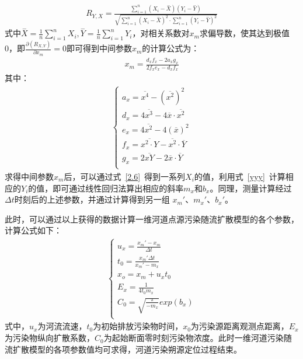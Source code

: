 \documentclass{whutmod}
\begin{document}
	\begin{gather*}
		R_{Y,X}=\frac{\sum_{i=1}^{n}(X_{i}-\overset{-}{X})(Y_{i}-\overset{-}{Y})}{\sqrt{\sum_{i=1}^{n}(X_{i}-\overset{-}{X})^{2}\cdot \sum_{i=1}^{n}(Y_{i}-\overset{-}{Y})^{2}}}
	\end{gather*}
	式中$\overset{-}{X}=\frac{1}{n}\sum_{i=1}^{n}X_{i},
	\overset{-}{Y}=\frac{1}{n}\sum_{i=1}^{n}Y_{i}
	$，对相关系数对$x_{m}$求偏导数，使其达到极值0，即$\frac{\partial(R_{X,Y}) }{\partial x_{m}}=0$即可得到中间参数$x_{m}$的计算公式为：
		\begin{gather}
x_{m}=\frac{d_{x}f_{x}-2a_{x}g_{x}}{2f_{x}e_{x}-d_{x}f_{x}}\label{2.6}
	\end{gather}
	其中：
		\begin{gather*}
	\left\{\begin{matrix}
a_{x}=\overline {x^{4}}-(\overline {x^{2}})^{2}	\\
	d_{x}=4\overline {x^{3}}-4\overline {x}\cdot\overline {x^{2}}\\
	e_{x}=4\overline{x^{2}}-4(\overline{x})^{2} \\
	f_{x}=\overline{x^{2}\cdot Y}-\overline{x^{2}}\cdot \overline{Y}\\
	g_{x}=2\overline{xY}-2\overline{x}\cdot \overline{Y}\\
	\end{matrix}\right.
	\end{gather*}
	求得中间参数$x_{m}$后，可以通过式~\ref{2.6}~得到一系列$X_{i}$的值，利用式~\ref{yyy}~计算相应的$Y_{i}$的值，即可通过线性回归法算出相应的斜率$m_{x}$和$b_{x}$。同理，测量计算经过$\Delta t$时刻后的上述参数，并通过计算得到另一组 ${x_{m}}'$、${m_{x}}'$、${b_{x}}'$。
	
	此时，可以通过以上获得的数据计算一维河道点源污染随流扩散模型的各个参数，计算公式如下：
			\begin{gather}
	\left\{\begin{matrix}
	 u_{x}=\frac{{x_{m}}'-x_{m}}{\Delta t}	\\
	t_{0}=\frac{{x_{m}}'\Delta t}{{x_{m}}'-m_{x}}\\
	x_{o}=x_{m}+u_{x}t_{0} \\
	E_{x}=\frac{1}{4t_{0}m_{x}}\\
	C_{0}=\sqrt{\frac{\pi}{-m_{x}}}exp(b_{x})\\
	\end{matrix}\right.\label{9999}
	\end{gather}
	式中，$u_{x}$为河流流速，$t_{0}$为初始排放污染物时间，$x_{0}$为污染源距离观测点距离，$E_{x}$为污染物纵向扩散系数，$C_{0}$为起始断面零时刻污染物浓度。此时一维河道污染随流扩散模型的各项参数值均可求得，河道污染朔源定位过程结束。
	
\end{document}
